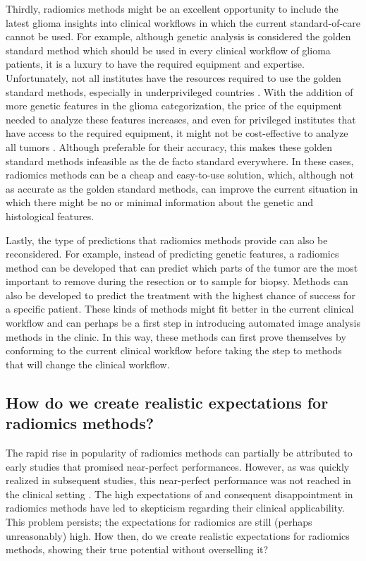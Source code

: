 Thirdly, radiomics methods might be an excellent opportunity to include the latest glioma insights into clinical workflows in which the current standard-of-care cannot be used.
For example, although genetic analysis is considered the golden standard method which should be used in every clinical workflow of glioma patients, it is a luxury to have the required equipment and expertise.
Unfortunately, not all institutes have the resources required to use the golden standard methods, especially in underprivileged countries \autocite{santosh2019india}.
With the addition of more genetic features in the glioma categorization, the price of the equipment needed to analyze these features increases, and even for privileged institutes that have access to the required equipment, it might not be cost-effective to analyze all \glspl{tumor} \autocite{malzkorn2016practical,dewitt2017costIDH}.
Although preferable for their accuracy, this makes these golden standard methods infeasible as the de facto standard everywhere.
In these cases, radiomics methods can be a cheap and easy-to-use solution, which, although not as accurate as the golden standard methods, can improve the current situation in which there might be no or minimal information about the genetic and histological features.

Lastly, the type of predictions that radiomics methods provide can also be reconsidered.
For example, instead of predicting genetic features, a radiomics method can be developed that can predict which parts of the \gls{tumor} are the most important to remove during the resection or to sample for biopsy.
Methods can also be developed to predict the treatment with the highest chance of success for a specific patient.
These kinds of methods might fit better in the current clinical workflow and can perhaps be a first step in introducing automated image analysis methods in the clinic.
In this way, these methods can first prove themselves by conforming to the current clinical workflow before taking the step to methods that will change the clinical workflow.

\subsection{How do we create realistic expectations for radiomics methods?}

The rapid rise in popularity of radiomics methods can partially be attributed to early studies that promised near-perfect performances.
However, as was quickly realized in subsequent studies, this near-perfect performance was not reached in the clinical setting \autocite{gillies2016radiomics}.
The high expectations of and consequent disappointment in radiomics methods have led to skepticism regarding their clinical applicability.
This problem persists; the expectations for radiomics are still (perhaps unreasonably) high.
How then, do we create realistic expectations for radiomics methods, showing their true potential without overselling it?

